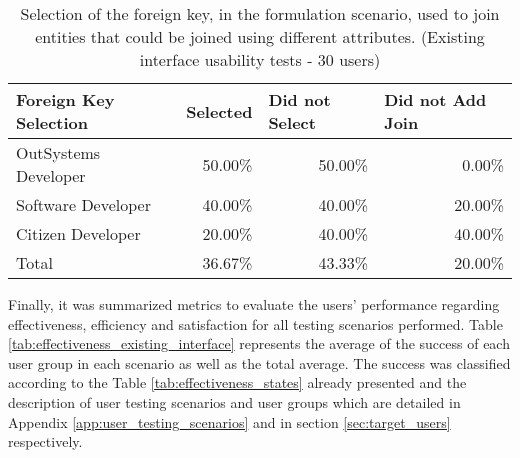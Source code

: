 \begin{table}[tb]
    \caption{Selection of the foreign key, in the formulation scenario, used to join entities that could be joined using different attributes. (Existing interface usability tests - 30 users)}
    \label{tab:existingInterfaceForeignKeySelection}
    \begin{tabular}{@{}lrrr@{}}
    \toprule
    \textbf{Foreign Key Selection} & \multicolumn{1}{l}{Selected} & \multicolumn{1}{l}{Did not Select} & \multicolumn{1}{l}{Did not Add Join} \\ \midrule
    OutSystems Developer           & 50.00\%                      & 50.00\%                            & 0.00\%                               \\
    Software Developer             & 40.00\%                      & 40.00\%                            & 20.00\%                              \\
    Citizen Developer              & 20.00\%                      & 40.00\%                            & 40.00\%                              \\
    Total                          & 36.67\%                      & 43.33\%                            & 20.00\%                              \\ \bottomrule
    \end{tabular}
    \end{table}

Finally, it was summarized metrics to evaluate the users' performance regarding effectiveness, efficiency and satisfaction for all testing scenarios performed. Table \ref{tab:effectiveness_existing_interface} represents the average of the success of each user group in each scenario as well as the total average. The success was classified according to the Table \ref{tab:effectiveness_states} already presented and the description of user testing scenarios and user groups which are detailed in Appendix \ref{app:user_testing_scenarios} and in section \ref{sec:target_users} respectively.




